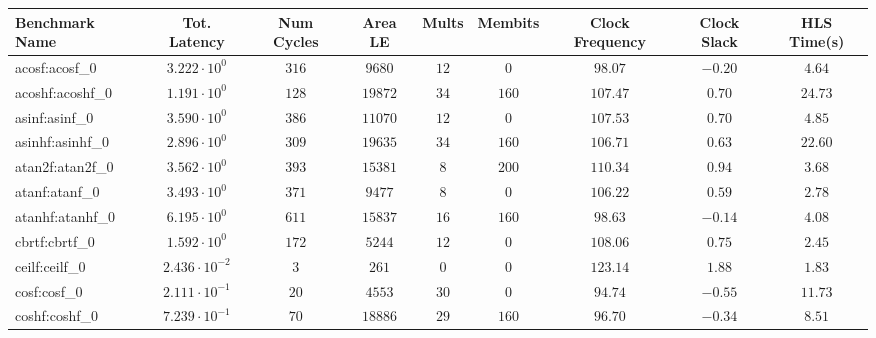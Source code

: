 \begin{tabular}{|l|c|c|c|c|c|c|c|c|}
\hline
Benchmark Name               & Tot. Latency            & Num Cycles & Area LE    & Mults   & Membits  & Clock Frequency & Clock Slack & HLS Time(s) \\
\hline
acosf:acosf\_0               & $ 3.222 \cdot 10^{0}  $ & $ 316    $ & $ 9680   $ & $ 12  $ & $ 0    $ & $ 98.07       $ & $ -0.20   $ & $ 4.64    $ \\
acoshf:acoshf\_0             & $ 1.191 \cdot 10^{0}  $ & $ 128    $ & $ 19872  $ & $ 34  $ & $ 160  $ & $ 107.47      $ & $ 0.70    $ & $ 24.73   $ \\
asinf:asinf\_0               & $ 3.590 \cdot 10^{0}  $ & $ 386    $ & $ 11070  $ & $ 12  $ & $ 0    $ & $ 107.53      $ & $ 0.70    $ & $ 4.85    $ \\
asinhf:asinhf\_0             & $ 2.896 \cdot 10^{0}  $ & $ 309    $ & $ 19635  $ & $ 34  $ & $ 160  $ & $ 106.71      $ & $ 0.63    $ & $ 22.60   $ \\
atan2f:atan2f\_0             & $ 3.562 \cdot 10^{0}  $ & $ 393    $ & $ 15381  $ & $ 8   $ & $ 200  $ & $ 110.34      $ & $ 0.94    $ & $ 3.68    $ \\
atanf:atanf\_0               & $ 3.493 \cdot 10^{0}  $ & $ 371    $ & $ 9477   $ & $ 8   $ & $ 0    $ & $ 106.22      $ & $ 0.59    $ & $ 2.78    $ \\
atanhf:atanhf\_0             & $ 6.195 \cdot 10^{0}  $ & $ 611    $ & $ 15837  $ & $ 16  $ & $ 160  $ & $ 98.63       $ & $ -0.14   $ & $ 4.08    $ \\
cbrtf:cbrtf\_0               & $ 1.592 \cdot 10^{0}  $ & $ 172    $ & $ 5244   $ & $ 12  $ & $ 0    $ & $ 108.06      $ & $ 0.75    $ & $ 2.45    $ \\
ceilf:ceilf\_0               & $ 2.436 \cdot 10^{-2} $ & $ 3      $ & $ 261    $ & $ 0   $ & $ 0    $ & $ 123.14      $ & $ 1.88    $ & $ 1.83    $ \\
cosf:cosf\_0                 & $ 2.111 \cdot 10^{-1} $ & $ 20     $ & $ 4553   $ & $ 30  $ & $ 0    $ & $ 94.74       $ & $ -0.55   $ & $ 11.73   $ \\
coshf:coshf\_0               & $ 7.239 \cdot 10^{-1} $ & $ 70     $ & $ 18886  $ & $ 29  $ & $ 160  $ & $ 96.70       $ & $ -0.34   $ & $ 8.51    $ \\

\end{tabular}
